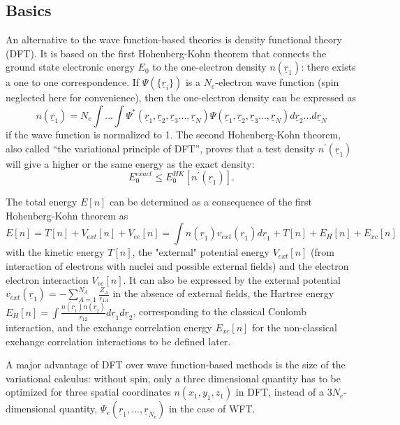 \documentclass[11pt,DIV=13,BCOR=5mm,a4paper,headinclude]{scrbook}
\renewcommand{\vec}[1]{\underline{#1}}
\begin{document}
\subsection{Basics}
An alternative to the wave function-based theories is density functional theory (DFT).
It is based on the first Hohenberg-Kohn theorem\cite{Hohenberg-Kohn1964} that connects the ground state electronic energy $E_0$ to the one-electron density $n(\vec{r}_1)$: there exists a one to one correspondence.
If $\Psi(\{\vec{r}_i\})$ is a $N_e$-electron wave function (spin neglected here for convenience), then the one-electron density can be expressed as
\begin{equation}\label{eq:electron-density}
 n(\vec{r}_1)=N_e\int ...
\int \Psi^\ast(\vec{r}_1,\vec{r}_2,\vec{r}_3...,\vec{r}_N)\Psi(\vec{r}_1,\vec{r}_2,\vec{r}_3...,\vec{r}_N) d \vec{r}_2...d \vec{r}_N
\end{equation}
if the wave function is normalized to 1.
The second Hohenberg-Kohn theorem, also called ``the variational principle of DFT'', proves that a test density $n^\prime(\vec{r}_1)$ will give a higher or the same energy as the exact density:
\begin{equation}
 E_0^{exact}\leq E_0^{HK}[n^\prime(\vec{r}_1)].
\end{equation}


The total energy $E[n]$ can be determined as a consequence of the first Hohenberg-Kohn theorem as
\begin{equation}
 E[n]=T[n] + V_{ext}[n] + V_{ee}[n]=\int n(\vec{r}_1)v_{ext}(\vec{r}_1)d\vec{r}_1 + T[n]+E_H[n]+E_{xc}[n]
\end{equation}
with the kinetic energy $T[n]$, the "external" potential energy $V_{ext}[n]$ (from interaction of electrons with nuclei and possible external fields) and the electron electron interaction $V_{ee}[n]$.
It can also be expressed by the external potential $v_{ext}(\vec{r}_1)=-\sum_{A=1}^{N_A}\frac{Z_A}{r_{1A}}$ in the absence of external fields, the Hartree energy $E_H[n]=\int\frac{n(\vec{r}_1)n(\vec{r}_2)}{r_{12}}d\vec{r}_1d\vec{r}_2$, corresponding to the classical Coulomb interaction, and the exchange correlation energy $E_{xc}[n]$ for the non-classical exchange correlation interactions to be defined later.


A major advantage of DFT over wave function-based methods is the size of the variational calculus: without spin, only a three dimensional quantity has to be optimized for three spatial coordinates $n(x_1,y_1,z_1)$ in DFT, instead of a $3N_e$-dimensional quantity, $\Psi_e(\vec{r}_1,...,\vec{r}_{N_e})$ in the case of WFT. %
\end{document}
